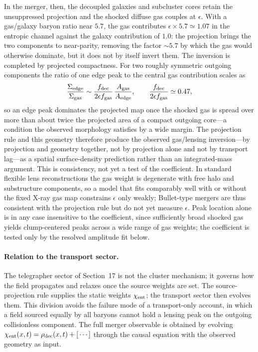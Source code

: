 \documentclass[11pt]{article}
\begin{document}
In the merger, then, the decoupled galaxies and subcluster cores retain the unsuppressed projection and the shocked diffuse gas couples at $\epsilon$. With a gas/galaxy baryon ratio near $5.7$, the gas contributes $\epsilon\times5.7\simeq1.07$ in the entropic channel against the galaxy contribution of $1.0$: the projection brings the two components to near-parity, removing the factor $\sim\!5.7$ by which the gas would otherwise dominate, but it does not by itself invert them. The inversion is completed by projected compactness. For two roughly symmetric outgoing components the ratio of one edge peak to the central gas contribution scales as
\[
\frac{\Sigma_{\rm edge}}{\Sigma_{\rm gas}}
\sim
\frac{f_{\rm dec}}{2\epsilon f_{\rm gas}}\,
\frac{A_{\rm gas}}{A_{\rm edge}},
\qquad
\frac{f_{\rm dec}}{2\epsilon f_{\rm gas}}\simeq0.47 ,
\]
so an edge peak dominates the projected map once the shocked gas is spread over more than about twice the projected area of a compact outgoing core---a condition the observed morphology satisfies by a wide margin. The projection rule and this geometry therefore produce the observed gas/lensing inversion---by projection and geometry together, not by projection alone and not by transport lag---as a spatial surface-density prediction rather than an integrated-mass argument. This is consistency, not yet a test of the coefficient. In standard flexible lens reconstructions the gas weight is degenerate with free halo and substructure components, so a model that fits comparably well with or without the fixed X-ray gas map constrains $\epsilon$ only weakly; Bullet-type mergers are thus consistent with the projection rule but do not yet measure $\epsilon$. Peak location alone is in any case insensitive to the coefficient, since sufficiently broad shocked gas yields clump-centered peaks across a wide range of gas weights; the coefficient is tested only by the resolved amplitude fit below.

\paragraph{Relation to the transport sector.}
The telegrapher sector of Section~17 is not the cluster mechanism; it governs how the field propagates and relaxes once the source weights are set. The source-projection rule supplies the static weights $\chi_{\rm ent}$; the transport sector then evolves them. This division avoids the failure mode of a transport-only account, in which a field sourced equally by all baryons cannot hold a lensing peak on the outgoing collisionless component. The full merger observable is obtained by evolving $\chi_{\rm ent}(x,t)=\rho_{\rm dec}(x,t)+[\,\cdots]$ through the causal equation with the observed geometry as input.
\end{document}

